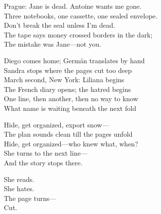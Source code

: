 \begin{lyrics}
Prague: Jane is dead. Antoine wants me gone.\\
Three notebooks, one cassette, one sealed envelope.\\
Don’t break the seal unless I’m dead.\\
The tape says money crossed borders in the dark;\\
The mistake was Jane—not you.

Diego comes home; Germán translates by hand\\
Sandra stops where the pages cut too deep\\
March second, New York: Liliana begins\\
The French diary opens; the hatred begins\\
One line, then another, then no way to know\\
What name is waiting beneath the next fold

Hide, get organized, export snow—\\
The plan sounds clean till the pages unfold\\
Hide, get organized—who knew what, when?\\
She turns to the next line—\\
And the story stops there.

She reads.\\
She hates.\\
The page turns—\\
Cut.
\end{lyrics}

